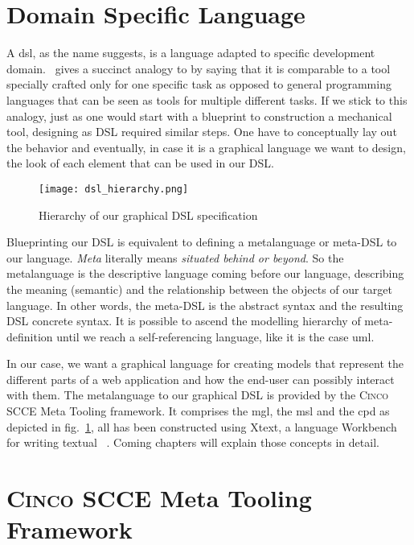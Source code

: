 \section{Domain Specific Language}

A \acrfull{dsl}, as the name suggests, is a language adapted to specific development domain.~\cite{Naujokat2018} gives a succinct analogy to  by saying that it is comparable to a tool specially crafted only for one specific task as opposed to general programming languages that can be seen as tools for multiple different tasks. If we stick to this analogy, just as one would start with a blueprint to construction a mechanical tool, designing as DSL required similar steps. One have to conceptually lay out the behavior and eventually, in case it is a graphical language we want to design, the look of each element that can be used in our DSL. 

\begin{figure}[H]
    \centering
    \texttt{[image: dsl\_hierarchy.png]}
    \caption{Hierarchy of our graphical DSL specification}
    \label{fig:modelling-hierachy}
\end{figure}

Blueprinting our DSL is equivalent to defining a metalanguage or meta-DSL to our language. \textit{Meta} literally means \textit{situated behind or beyond}. So the metalanguage is the descriptive language coming before our language, describing the meaning (semantic) and the relationship between the objects of our target language. In other words, the meta-DSL is the abstract syntax and the resulting DSL concrete syntax. It is possible to ascend the modelling hierarchy of meta-definition until we reach a self-referencing language, like it is the case \acrfull{uml}.

In our case, we want a graphical language for creating models that represent the different parts of a web application and how the end-user can possibly interact with them. The metalanguage to our graphical DSL is provided by the \textsc{Cinco} SCCE Meta Tooling framework. It comprises the \acrfull{mgl}, the \acrfull{msl} and the \acrfull{cpd} as depicted in fig.~\ref{fig:modelling-hierachy}, all has been constructed using Xtext, a language Workbench for writing textual ~\cite{naujokat-diss}. Coming chapters will explain those concepts in detail.

\section{\textsc{Cinco SCCE} Meta Tooling Framework}\label{sec:cincoTool}

